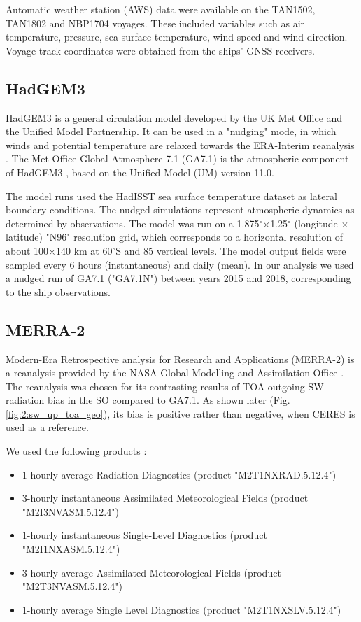 Automatic weather station (AWS) data were available on the TAN1502, TAN1802 and
NBP1704 voyages. These included variables such as air temperature, pressure,
sea surface temperature, wind speed and wind direction. Voyage track
coordinates were obtained from the ships' GNSS receivers.

\subsection{HadGEM3}
\label{sec:2:hadgem3}
HadGEM3 \citep{walters2017} is a general circulation model developed by the UK
Met Office and the Unified Model Partnership.
It can be used in a "nudging" \citep{telford2008} mode, in which winds and
potential temperature are relaxed towards the ERA-Interim reanalysis
\citep{dee2011}. The Met Office Global Atmosphere 7.1 (GA7.1) is the atmospheric
component of HadGEM3 \citep{walters2017}, based on the Unified Model (UM)
version 11.0.

The model runs used the HadISST sea surface temperature dataset
\citep{rayner2003} as lateral boundary conditions. The nudged simulations
represent atmospheric dynamics as determined by observations. The model was run
on a 1.875$^\circ$$\times$1.25$^\circ$ (longitude $\times$ latitude) "N96"
resolution grid, which corresponds to a horizontal resolution of about
100$\times$140 \unit{km} at 60$^\circ$S and 85 vertical levels. The model output
fields were sampled every 6 hours (instantaneous) and daily (mean). In our
analysis we used a nudged run of GA7.1 ("GA7.1N") between years 2015 and 2018,
corresponding to the ship observations.

\subsection{MERRA-2}
\label{sec:2:merra-2}

Modern-Era Retrospective analysis for Research and Applications (MERRA-2) is a
reanalysis provided by the NASA Global Modelling and Assimilation Office
\citep{gelaro2017}. The reanalysis was chosen for its contrasting results of
TOA outgoing SW radiation bias in the SO compared to GA7.1. As shown later
(Fig. \ref{fig:2:sw_up_toa_geo}), its bias is positive rather than negative,
when CERES is used as a reference.

We used the following products \citep{bosilovich2015}:

\begin{itemize}
\item 1-hourly average Radiation Diagnostics (product "M2T1NXRAD.5.12.4")
\item 3-hourly instantaneous Assimilated Meteorological Fields (product
"M2I3NVASM.5.12.4")
\item 1-hourly instantaneous Single-Level Diagnostics (product
"M2I1NXASM.5.12.4")
\item 3-hourly average Assimilated Meteorological Fields (product
"M2T3NVASM.5.12.4")
\item 1-hourly average Single Level Diagnostics (product "M2T1NXSLV.5.12.4")
\end{itemize}

